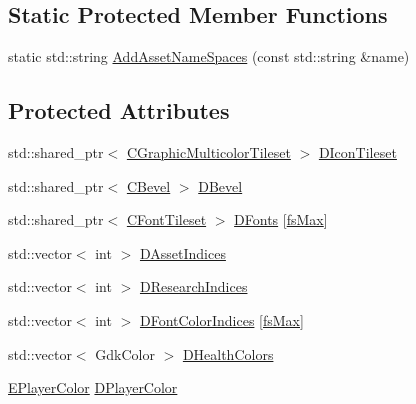 \subsection*{Static Protected Member Functions}
\begin{DoxyCompactItemize}
\item 
static std\+::string \hyperlink{classCUnitDescriptionRenderer_ae18d6862ae305bd5633558f86457270b}{Add\+Asset\+Name\+Spaces} (const std\+::string \&name)
\end{DoxyCompactItemize}
\subsection*{Protected Attributes}
\begin{DoxyCompactItemize}
\item 
std\+::shared\+\_\+ptr$<$ \hyperlink{classCGraphicMulticolorTileset}{C\+Graphic\+Multicolor\+Tileset} $>$ \hyperlink{classCUnitDescriptionRenderer_aadf76b5c018d76c3ff7bd8edc021d702}{D\+Icon\+Tileset}
\item 
std\+::shared\+\_\+ptr$<$ \hyperlink{classCBevel}{C\+Bevel} $>$ \hyperlink{classCUnitDescriptionRenderer_a9f4cd9f9d8dbc5036c885980494db41e}{D\+Bevel}
\item 
std\+::shared\+\_\+ptr$<$ \hyperlink{classCFontTileset}{C\+Font\+Tileset} $>$ \hyperlink{classCUnitDescriptionRenderer_a270a545ecdb1602cd2a0a2def8997dc8}{D\+Fonts} \mbox{[}\hyperlink{classCUnitDescriptionRenderer_a3ea4cd83b6dd9533ab3abb953a7da35aa74218e4708bac1eab359099eb0b159b2}{fs\+Max}\mbox{]}
\item 
std\+::vector$<$ int $>$ \hyperlink{classCUnitDescriptionRenderer_a3d311375ab23745786d20076842e3099}{D\+Asset\+Indices}
\item 
std\+::vector$<$ int $>$ \hyperlink{classCUnitDescriptionRenderer_aa34762a0be929d92ac9f0b151e3e3187}{D\+Research\+Indices}
\item 
std\+::vector$<$ int $>$ \hyperlink{classCUnitDescriptionRenderer_acb9416ccf452db38d4817711cd9d6abb}{D\+Font\+Color\+Indices} \mbox{[}\hyperlink{classCUnitDescriptionRenderer_a3ea4cd83b6dd9533ab3abb953a7da35aa74218e4708bac1eab359099eb0b159b2}{fs\+Max}\mbox{]}
\item 
std\+::vector$<$ Gdk\+Color $>$ \hyperlink{classCUnitDescriptionRenderer_afa1e3591f74862f7640695f0f6125bc7}{D\+Health\+Colors}
\item 
\hyperlink{GameDataTypes_8h_aafb0ca75933357ff28a6d7efbdd7602f}{E\+Player\+Color} \hyperlink{classCUnitDescriptionRenderer_af2214b623c3b34eb4d6db9afc841b7a2}{D\+Player\+Color}

\end{DoxyCompactItemize}
